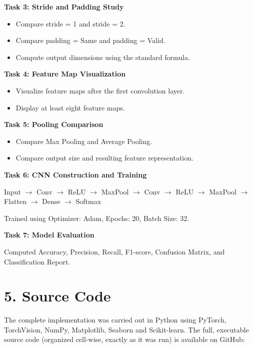 \documentclass[11pt]{article}
\begin{document}
\bigskip

\textbf{Task 3: Stride and Padding Study}
\begin{itemize}
\item Compare stride = 1 and stride = 2.
\item Compare padding = Same and padding = Valid.
\item Compute output dimensions using the standard formula.
\end{itemize}

\bigskip

\textbf{Task 4: Feature Map Visualization}
\begin{itemize}
\item Visualize feature maps after the first convolution layer.
\item Display at least eight feature maps.
\end{itemize}

\bigskip

\textbf{Task 5: Pooling Comparison}
\begin{itemize}
\item Compare Max Pooling and Average Pooling.
\item Compare output size and resulting feature representation.
\end{itemize}

\bigskip

\textbf{Task 6: CNN Construction and Training}

\begin{center}
Input $\rightarrow$ Conv $\rightarrow$ ReLU $\rightarrow$ MaxPool $\rightarrow$ Conv $\rightarrow$ ReLU $\rightarrow$ MaxPool $\rightarrow$ Flatten $\rightarrow$ Dense $\rightarrow$ Softmax
\end{center}

Trained using Optimizer: Adam, Epochs: 20, Batch Size: 32.

\bigskip

\textbf{Task 7: Model Evaluation}

Computed Accuracy, Precision, Recall, F1-score, Confusion Matrix, and Classification Report.


\section*{5. Source Code}

The complete implementation was carried out in Python using PyTorch, TorchVision, NumPy, Matplotlib, Seaborn and Scikit-learn. The full, executable source code (organized cell-wise, exactly as it was run) is available on GitHub:
\end{document}
